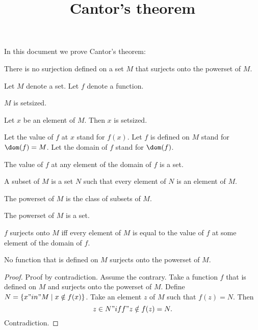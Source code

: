 \documentclass{article}
\title{Cantor's theorem}
\author{}
\date{}
\begin{document}

  \maketitle

  In this document we prove Cantor's theorem:

  \begin{quotedtheorem}
    There is no surjection defined on a set $M$ that surjects onto the powerset of $M$.
  \end{quotedtheorem}

  \begin{forthel}

    Let $M$ denote a set. Let $f$ denote a function.

    \begin{axiom}
        $M$ is setsized.
    \end{axiom}

    \begin{axiom}
        Let $x$ be an element of $M$. Then $x$ is setsized.
    \end{axiom}

    Let the value of $f$ at $x$ stand for $f(x)$.
    Let $f$ is defined on $M$ stand for $\dom(f) = M$.
    Let the domain of $f$ stand for $\dom(f)$.


    \begin{axiom}
      The value of $f$ at any element of the domain of $f$ is a set.
    \end{axiom}

    \begin{definition}[Subset]
      A subset of $M$ is a set $N$ such that every element of $N$ is an element of $M$.
    \end{definition}

    \begin{definition}
      The powerset of $M$ is the class of subsets of $M$.
    \end{definition}

    \begin{axiom}
      The powerset of $M$ is a set.
    \end{axiom}

    \begin{definition}
      $f$ surjects onto $M$ iff every element of $M$ is equal to the value of $f$ at some element of the domain of $f$.
    \end{definition}

    \begin{theorem}[Cantor]
      No function that is defined on $M$ surjects onto the powerset of $M$.
    \end{theorem}
    \begin{proof}
      Proof by contradiction. Assume the contrary.
      Take a function $f$ that is defined on $M$ and surjects onto the powerset of $M$.
      Define $N = \{ x "in" M \mid x \notin f(x) \}$.
      Take an element $z$ of $M$ such that $f(z) = N$.
      Then $$z\in N "iff" z\notin f(z) = N.$$
      Contradiction.
    \end{proof}

  \end{forthel}
\end{document}
